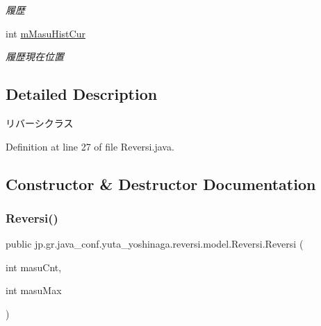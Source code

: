 \begin{DoxyCompactItemize}
\begin{DoxyCompactList}\small\item\em 履歴 \end{DoxyCompactList}\item 
\mbox{\label{classjp_1_1gr_1_1java__conf_1_1yuta__yoshinaga_1_1reversi_1_1model_1_1_reversi_aaedf62ec913875540109bfbe01bb1969}} 
int \mbox{\hyperlink{classjp_1_1gr_1_1java__conf_1_1yuta__yoshinaga_1_1reversi_1_1model_1_1_reversi_aaedf62ec913875540109bfbe01bb1969}{m\+Masu\+Hist\+Cur}}
\begin{DoxyCompactList}\small\item\em 履歴現在位置 \end{DoxyCompactList}\end{DoxyCompactItemize}


\subsection{Detailed Description}
リバーシクラス 

Definition at line 27 of file Reversi.\+java.



\subsection{Constructor \& Destructor Documentation}
\mbox{\label{classjp_1_1gr_1_1java__conf_1_1yuta__yoshinaga_1_1reversi_1_1model_1_1_reversi_a22abbc9c1a2016388dafb08dc9a7b820}} 
\subsubsection{\texorpdfstring{Reversi()}{Reversi()}\hspace{0.1cm}{\footnotesize\ttfamily [1/2]}}
{\footnotesize\ttfamily public jp.\+gr.\+java\+\_\+conf.\+yuta\+\_\+yoshinaga.\+reversi.\+model.\+Reversi.\+Reversi (\begin{DoxyParamCaption}\item[{int}]{masu\+Cnt,  }\item[{int}]{masu\+Max }\end{DoxyParamCaption})}



